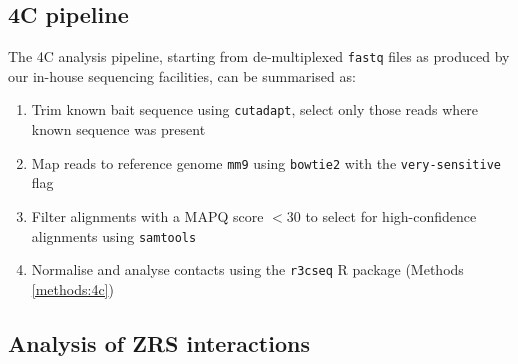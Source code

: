 \documentclass[a4paper,11pt,oneside]{book}
\begin{document}
\subsection{4C pipeline}

The 4C analysis pipeline, starting from de-multiplexed \texttt{fastq} files as produced by our in-house sequencing facilities, can be summarised as:

\begin{enumerate}
\item Trim known bait sequence using \texttt{cutadapt},\cite{cutadapt} select only those reads where known sequence was present
\item Map reads to reference genome \texttt{mm9} using \texttt{bowtie2}\cite{Langmead2012} with the \texttt{very-sensitive} flag
\item Filter alignments with a MAPQ score $<30$ to select for high-confidence alignments using \texttt{samtools}\cite{Li2009}
\item Normalise and analyse contacts using the \texttt{r3cseq} R package (Methods \ref{methods:4c})
\end{enumerate}


\subsection{Analysis of ZRS interactions}
\end{document}
